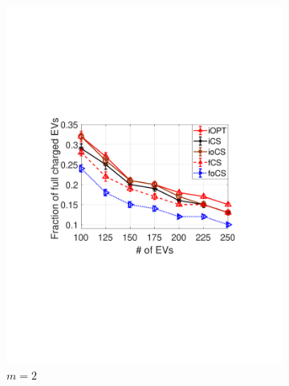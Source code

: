 \documentclass[11pt]{article}
\begin{document}
\begin{figure}[t]	
				\centering
				\begin{subfigure}[b]{0.3\textwidth}
					\begin{center}
						\includegraphics[width=\textwidth]{acc-M2.pdf}
						\caption{$m=2$}
						\label{fig:acc-M2}
					\end{center}
				\end{subfigure}
				\begin{subfigure}[b]{0.3\textwidth}
					\begin{center}

\end{center}
\end{subfigure}
\end{figure}
\end{document}
